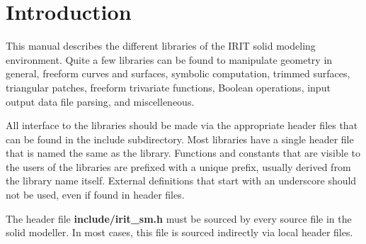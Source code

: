 % 
% 
%


\setlength{\oddsidemargin}{0.0in}
\setlength{\evensidemargin}{0.0in}
\setlength{\topmargin}{-0.2in}
\setlength{\textwidth}{6.5in}
\setlength{\textheight}{9.0in}

\makeindex



\small
\setlength{\baselineskip}{0.85\baselineskip}

\tableofcontents

\chapter{Introduction}

This manual describes the different libraries of the IRIT solid
modeling environment. Quite a few libraries can be found to manipulate
geometry in general, freeform curves and surfaces, symbolic
computation, trimmed surfaces, triangular patches, freeform trivariate
functions, Boolean operations, input output data file parsing, and
miscelleneous.

All interface to the libraries should be made via the appropriate header
files that can be found in the include subdirectory. Most libraries
have a single header file that is named the same as the library.
Functions and constants that are visible to the users of the libraries
are prefixed with a unique prefix, usually derived from the library
name itself. External definitions that start with an underscore should
not be used, even if found in header files.

The header file {\bf include/irit\_sm.h} must be sourced by every
source file in the solid modeller. In most cases, this file is sourced
indirectly via local header files.

